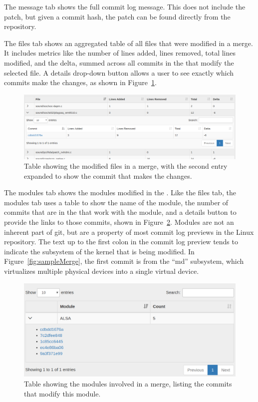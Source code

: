 The message tab shows the full commit log message. This does not include
the patch, but given a commit hash, the patch can be found directly from
the repository.

The files tab shows an aggregated table of all files that were modified
in a merge. It includes metrics like the number of lines added, lines
removed, total lines modified, and the delta, summed across all commits
in the \mt{} that modify the selected file. A details drop-down button
allows a user to see exactly which commits make the changes, as shown in
Figure~\ref{fig:linvis_files_results}.

\begin{figure}[htpb]
  \centering
  \includegraphics[width=0.9\linewidth]{Figures/Linvis/linvis_files.png}
  \caption{Table showing the modified files in a merge, with the second
    entry expanded to show the commit that makes the changes.}
  \label{fig:linvis_files_results}
\end{figure}

The modules tab shows the modules modified in the \mt{}. Like the files
tab, the modules tab uses a table to show the name of the module, the
number of commits that are in the \mt{} that work with the module, and a
details button to provide the links to those commits, shown in
Figure~\ref{fig:linvis_modules_results}. Modules are not an inherent
part of git, but are a property of most commit log previews in the Linux
repository. The text up to the first colon in the commit log preview
tends to indicate the subsystem of the kernel that is being modified. In
Figure~\ref{fig:sampleMerge}, the first commit is from the ``md''
subsystem, which virtualizes multiple physical devices into a single
virtual device.

\begin{figure}[htpb]
  \centering
  \includegraphics[width=0.9\linewidth]{Figures/Linvis/linvis_modules.png}
  \caption{Table showing the modules involved in a merge, listing the
    commits that modify this module.}
  \label{fig:linvis_modules_results}
\end{figure}

